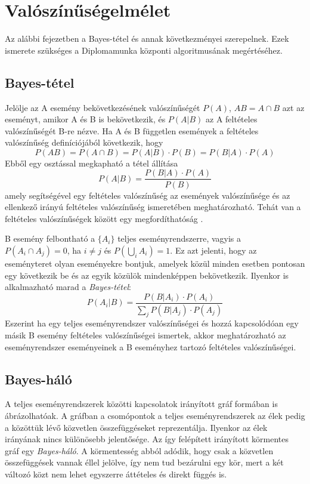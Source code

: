 \chapter{Valószínűségelmélet}

Az alábbi fejezetben a Bayes-tétel és annak következményei szerepelnek. Ezek ismerete szükséges a Diplomamunka központi algoritmusának megértéséhez.

\section{Bayes-tétel}
Jelölje az A esemény bekövetkezésének valószínűségét $P(A)$, $AB = A \cap B$ azt az eseményt, amikor A és B is bekövetkezik, és $P(A|B)$ az A feltételes valószínűségét B-re nézve. Ha A és B független események a feltételes valószínűség definíciójából következik, hogy 
$$P(AB) = P(A \cap B) = P(A|B) \cdot P(B) =  P(B|A) \cdot P(A) $$
Ebből egy osztással megkapható a tétel állítása
$$P(A|B) = \frac{P(B|A) \cdot P(A)}{P(B)}$$
amely segítségével egy feltételes valószínűség az események valószínűsége és az ellenkező irányú feltételes valószínűség ismeretében meghatározható. Tehát van a feltételes valószínűségek között egy megfordíthatóság \cite{laszlo2011bayesi}.

B esemény felbontható a $\{A_i\}$ teljes eseményrendszerre, vagyis a $P(A_i \cap A_j) = 0$, ha $i \neq j$ és $ P(\bigcup_{i} A_i) = 1$. Ez azt jelenti, hogy az eseményteret olyan eseményekre bontjuk, amelyek közül minden esetben pontosan egy következik be és az egyik közülök mindenképpen bekövetkezik. Ilyenkor is alkalmazható marad a \emph{Bayes-tétel}:
$$P(A_i|B) = \frac{P(B|A_i) \cdot P(A_i)}{\sum_{j} P(B|A_j) \cdot P(A_j)}$$
Eszerint ha egy teljes eseményrendszer valószínűségei és hozzá kapcsolódóan egy másik B esemény feltételes valószínűségei ismertek, akkor meghatározható az eseményrendszer eseményeinek a B eseményhez tartozó feltételes valószínűségei.

\section{Bayes-háló}
A teljes eseményrendszerek közötti kapcsolatok irányított gráf formában is ábrázolhatóak. A gráfban a csomópontok a teljes eseményrendszerek az élek pedig a közöttük lévő közvetlen összefüggéseket reprezentálja. Ilyenkor az élek irányának nincs különösebb jelentősége. Az így felépített irányított körmentes gráf egy \emph{Bayes-háló}. A körmentesség abból adódik, hogy csak a közvetlen összefüggések vannak éllel jelölve, így nem tud bezárulni egy kör, mert a két változó közt nem lehet egyszerre áttételes és direkt függés is.

